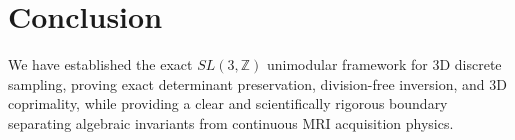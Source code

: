 \documentclass{article}
\theoremstyle{remark}
\begin{document}
\section{Conclusion}

We have established the exact $SL(3,\mathbb{Z})$ unimodular framework for 3D discrete sampling, proving exact determinant preservation, division-free inversion, and 3D coprimality, while providing a clear and scientifically rigorous boundary separating algebraic invariants from continuous MRI acquisition physics.
\end{document}
